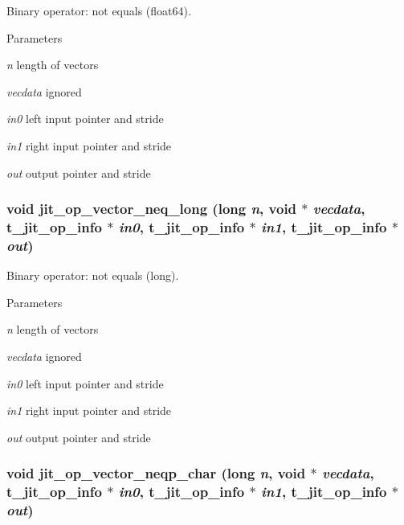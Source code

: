 Binary operator: not equals (float64). 
\begin{DoxyParams}{Parameters}
\item[{\em n}]length of vectors \item[{\em vecdata}]ignored \item[{\em in0}]left input pointer and stride \item[{\em in1}]right input pointer and stride \item[{\em out}]output pointer and stride \end{DoxyParams}
\hypertarget{group__opvecmod_gaa3a4995b1eda5ef6f7576c458215d56f}{
\subsubsection[{jit\_\-op\_\-vector\_\-neq\_\-long}]{\setlength{\rightskip}{0pt plus 5cm}void jit\_\-op\_\-vector\_\-neq\_\-long (long {\em n}, \/  void $\ast$ {\em vecdata}, \/  {\bf t\_\-jit\_\-op\_\-info} $\ast$ {\em in0}, \/  {\bf t\_\-jit\_\-op\_\-info} $\ast$ {\em in1}, \/  {\bf t\_\-jit\_\-op\_\-info} $\ast$ {\em out})}}
\label{group__opvecmod_gaa3a4995b1eda5ef6f7576c458215d56f}


Binary operator: not equals (long). 
\begin{DoxyParams}{Parameters}
\item[{\em n}]length of vectors \item[{\em vecdata}]ignored \item[{\em in0}]left input pointer and stride \item[{\em in1}]right input pointer and stride \item[{\em out}]output pointer and stride \end{DoxyParams}
\hypertarget{group__opvecmod_ga6eef3546ccd1cc2d269725eb95ef159c}{
\subsubsection[{jit\_\-op\_\-vector\_\-neqp\_\-char}]{\setlength{\rightskip}{0pt plus 5cm}void jit\_\-op\_\-vector\_\-neqp\_\-char (long {\em n}, \/  void $\ast$ {\em vecdata}, \/  {\bf t\_\-jit\_\-op\_\-info} $\ast$ {\em in0}, \/  {\bf t\_\-jit\_\-op\_\-info} $\ast$ {\em in1}, \/  {\bf t\_\-jit\_\-op\_\-info} $\ast$ {\em out})}}
\label{group__opvecmod_ga6eef3546ccd1cc2d269725eb95ef159c}


